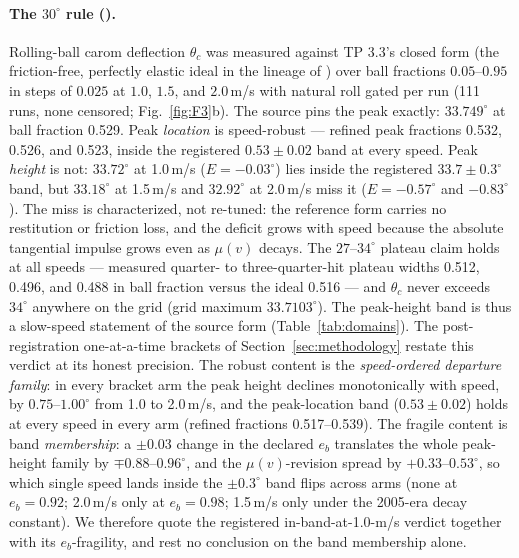 \paragraph{The $30^\circ$ rule ().}
Rolling-ball carom deflection $\theta_c$ was measured against TP 3.3's
closed form (the friction-free, perfectly elastic ideal in the lineage of
\citealp{wallace1988billiard}) over ball fractions $0.05$--$0.95$ in
steps of $0.025$ at $1.0$, $1.5$, and $2.0$\,m/s with natural roll gated
per run (111 runs, none censored; Fig.~\ref{fig:F3}b). The source pins
the peak exactly: $33.749^\circ$ at ball fraction 0.529. Peak
\emph{location} is speed-robust --- refined peak fractions 0.532, 0.526,
and 0.523, inside the registered $0.53 \pm 0.02$ band at every speed.
Peak \emph{height} is not: $33.72^\circ$ at 1.0\,m/s ($E = -0.03^\circ$)
lies inside the registered $33.7 \pm 0.3^\circ$ band, but $33.18^\circ$
at 1.5\,m/s and $32.92^\circ$ at 2.0\,m/s miss it ($E = -0.57^\circ$ and
$-0.83^\circ$). The miss is
characterized, not re-tuned: the reference form carries no restitution or
friction loss, and the deficit grows with speed because the absolute
tangential impulse grows even as $\mu(v)$ decays. The $27$--$34^\circ$
plateau claim holds at all speeds --- measured quarter- to
three-quarter-hit plateau widths 0.512, 0.496, and 0.488 in ball fraction
versus the ideal 0.516 --- and $\theta_c$ never exceeds $34^\circ$
anywhere on the grid (grid maximum $33.7103^\circ$). The peak-height
band is thus a slow-speed statement of the source form
(Table~\ref{tab:domains}). The post-registration one-at-a-time brackets
of Section~\ref{sec:methodology} restate this verdict at its honest
precision. The robust content is the \emph{speed-ordered departure
family}: in every bracket arm the peak height declines monotonically
with speed, by $0.75$--$1.00^\circ$ from 1.0 to 2.0\,m/s, and the
peak-location band ($0.53 \pm 0.02$) holds at every speed in every arm
(refined fractions 0.517--0.539). The fragile content is band
\emph{membership}: a $\pm 0.03$ change in the declared $e_b$ translates
the whole peak-height family by $\mp 0.88$--$0.96^\circ$, and the
$\mu(v)$-revision spread by $+0.33$--$0.53^\circ$, so which single speed
lands inside the $\pm 0.3^\circ$ band flips across arms (none at
$e_b = 0.92$; 2.0\,m/s only at $e_b = 0.98$; 1.5\,m/s only under the
2005-era decay constant). We therefore quote the registered
in-band-at-1.0-m/s verdict together with its $e_b$-fragility, and rest
no conclusion on the band membership alone.

